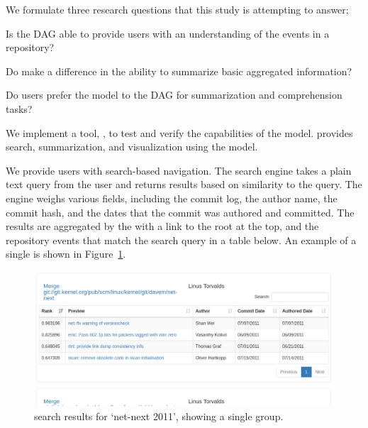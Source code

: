 \documentclass[conference, draftclsnofoot, draft]{IEEEtran}
\begin{document}
We formulate three research questions that this study is attempting to
answer;

\begin{RQ}
  \item

    Is the DAG able to provide users with an understanding of the events
    in a repository?

  \item

    Do \mt make a difference in the ability to summarize basic
    aggregated information?

  \item

    Do users prefer the \mt model to the DAG for summarization and
    comprehension tasks?

\end{RQ}


We implement a tool, \tool, to test and verify the capabilities of the
\mt model. \tool provides search, summarization, and
visualization using the \mt model.

We provide users with search-based navigation. The search engine takes a
plain text query from the user and returns results based on similarity
to the query. The engine weighs various fields, including the commit
log, the author name, the commit hash, and the dates that the commit was
authored and committed. The results are aggregated by the \mt
with a link to the root at the top, and the repository events that match
the search query in a table below.  An example of a single \mt is shown
in Figure~\ref{fig:linvis_search_results}.

\begin{figure}[htpb]
  \centering
  \includegraphics[width=1.0\linewidth]{figures/linvis/search_results.png}
  \caption{\tool search results for `net-next 2011', showing a single
    \mt group.}
  \label{fig:linvis_search_results}
\end{figure}
\end{document}
